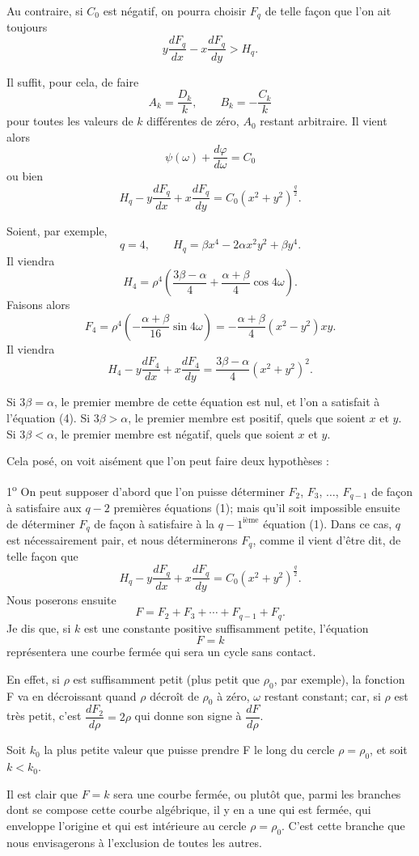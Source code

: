 \documentclass[11pt]{article}
\begin{document}
Au contraire, si $C_0$ est négatif, on pourra choisir $F_q$ de telle façon que l’on ait toujours
\[
y\frac{dF_q}{dx}-x\frac{dF_q}{dy}>H_q.
\]

Il suffit, pour cela, de faire
\[
A_k=\frac{D_k}{k},
\qquad
B_k=-\frac{C_k}{k}
\]
pour toutes les valeurs de $k$ différentes de zéro, $A_0$ restant arbitraire. Il vient alors
\[
\psi(\omega)+\frac{d\varphi}{d\omega}=C_0
\]
ou bien
\[
H_q-y\frac{dF_q}{dx}+x\frac{dF_q}{dy}=C_0(x^2+y^2)^{\frac q2}.
\]

Soient, par exemple,
\[
q=4,
\qquad
H_q=\beta x^4-2\alpha x^2y^2+\beta y^4.
\]
Il viendra
\[
H_4=\rho^4\left(\frac{3\beta-\alpha}{4}+\frac{\alpha+\beta}{4}\cos4\omega\right).
\]
Faisons alors
\[
F_4=\rho^4\left(-\frac{\alpha+\beta}{16}\sin4\omega\right)
=-\frac{\alpha+\beta}{4}(x^2-y^2)xy.
\]
Il viendra
\[
H_4-y\frac{dF_4}{dx}+x\frac{dF_4}{dy}=\frac{3\beta-\alpha}{4}(x^2+y^2)^2.
\]

Si $3\beta=\alpha$, le premier membre de cette équation est nul, et l’on a satisfait à l’équation (4). Si $3\beta>\alpha$, le premier membre est positif, quels que soient $x$ et $y$. Si $3\beta<\alpha$, le premier membre est négatif, quels que soient $x$ et $y$.

Cela posé, on voit aisément que l’on peut faire deux hypothèses :

1\textsuperscript{o} On peut supposer d’abord que l’on puisse déterminer $F_2$, $F_3$, $\ldots$, $F_{q-1}$ de façon à satisfaire aux $q-2$ premières équations (1); mais qu’il soit impossible ensuite de déterminer $F_q$ de façon à satisfaire à la $q-1^{\text{ième}}$ équation (1). Dans ce cas, $q$ est nécessairement pair, et nous déterminerons $F_q$, comme il vient d’être dit, de telle façon que
\[
H_q-y\frac{dF_q}{dx}+x\frac{dF_q}{dy}=C_0(x^2+y^2)^{\frac q2}.
\]
Nous poserons ensuite
\[
F=F_2+F_3+\cdots+F_{q-1}+F_q.
\]
Je dis que, si $k$ est une constante positive suffisamment petite, l’équation
\[
F=k
\]
représentera une courbe fermée qui sera un cycle sans contact.

En effet, si $\rho$ est suffisamment petit (plus petit que $\rho_0$, par exemple), la fonction F va en décroissant quand $\rho$ décroît de $\rho_0$ à zéro, $\omega$ restant constant; car, si $\rho$ est très petit, c’est $\dfrac{dF_2}{d\rho}=2\rho$ qui donne son signe à $\dfrac{dF}{d\rho}$.

Soit $k_0$ la plus petite valeur que puisse prendre F le long du cercle $\rho=\rho_0$, et soit $k<k_0$.

Il est clair que $F=k$ sera une courbe fermée, ou plutôt que, parmi les branches dont se compose cette courbe algébrique, il y en a une qui est fermée, qui enveloppe l’origine et qui est intérieure au cercle $\rho=\rho_0$. C’est cette branche que nous envisagerons à l’exclusion de toutes les autres.
\end{document}

